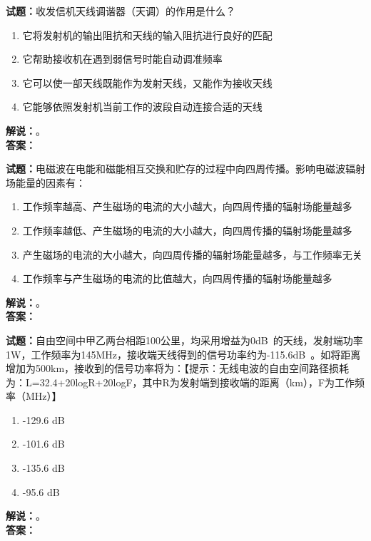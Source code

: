 \documentclass{ctexbook}
\begin{document}
\noindent\textbf{试题：}收发信机天线调谐器（天调）的作用是什么？
\begin{enumerate}[leftmargin=3em]
  \item 它将发射机的输出阻抗和天线的输入阻抗进行良好的匹配
  \item 它帮助接收机在遇到弱信号时能自动调准频率
  \item 它可以使一部天线既能作为发射天线，又能作为接收天线
  \item 它能够依照发射机当前工作的波段自动连接合适的天线
\end{enumerate}
\noindent\textbf{解说：}\textbf{}。\\\noindent\textbf{答案：}

\vspace{\baselineskip}

\noindent\textbf{试题：}电磁波在电能和磁能相互交换和贮存的过程中向四周传播。影响电磁波辐射场能量的因素有：
\begin{enumerate}[leftmargin=3em]
  \item 工作频率越高、产生磁场的电流的大小越大，向四周传播的辐射场能量越多
  \item 工作频率越低、产生磁场的电流的大小越大，向四周传播的辐射场能量越多
  \item 产生磁场的电流的大小越大，向四周传播的辐射场能量越多，与工作频率无关
  \item 工作频率与产生磁场的电流的比值越大，向四周传播的辐射场能量越多
\end{enumerate}
\noindent\textbf{解说：}\textbf{}。\\\noindent\textbf{答案：}

\vspace{\baselineskip}

\noindent\textbf{试题：}自由空间中甲乙两台相距100公里，均采用增益为0\unit[qualifier-mode=combine]{\deci\bel{}}的天线，发射端功率1W，工作频率为145\unit{\MHz}，接收端天线得到的信号功率约为-115.6\unit[qualifier-mode=combine]{\deci\bel{}}。如将距离增加为500km，接收到的信号功率将为：【提示：无线电波的自由空间路径损耗为：L=32.4+20logR+20logF，其中R为发射端到接收端的距离（km），F为工作频率（\unit{\MHz}）】
\begin{enumerate}[leftmargin=3em]
  \item -129.6 \unit[qualifier-mode=combine]{\deci\bel{}}
  \item -101.6 \unit[qualifier-mode=combine]{\deci\bel{}}
  \item -135.6 \unit[qualifier-mode=combine]{\deci\bel{}}
  \item -95.6 \unit[qualifier-mode=combine]{\deci\bel{}}
\end{enumerate}
\noindent\textbf{解说：}\textbf{}。\\\noindent\textbf{答案：}
\end{document}
